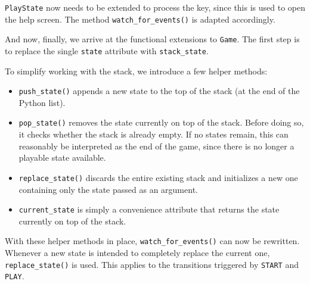 
\texttt{PlayState} now needs to be extended to process the  key, since this is used to open the help screen. The method \texttt{watch\_for\_events()} is adapted accordingly.

\newpage
{}

And now, finally, we arrive at the functional extensions to \texttt{Game}. The first step is to replace the single \texttt{state} attribute with \texttt{stack\_state}.


To simplify working with the stack, we introduce a few helper methods:

\begin{itemize}
	\item \texttt{push\_state()} appends a new state to the top of the stack (at the end of the Python list).
	
	\item \texttt{pop\_state()} removes the state currently on top of the stack. Before doing so, it checks whether the stack is already empty. If no states remain, this can reasonably be interpreted as the end of the game, since there is no longer a playable state available.
	
	\item \texttt{replace\_state()} discards the entire existing stack and initializes a new one containing only the state passed as an argument.
	
	\item \texttt{current\_state} is simply a convenience attribute that returns the state currently on top of the stack.
\end{itemize}


With these helper methods in place, \texttt{watch\_for\_events()} can now be rewritten. Whenever a new state is intended to completely replace the current one, \texttt{replace\_state()} is used. This applies to the transitions triggered by \texttt{START} and \texttt{PLAY}.

